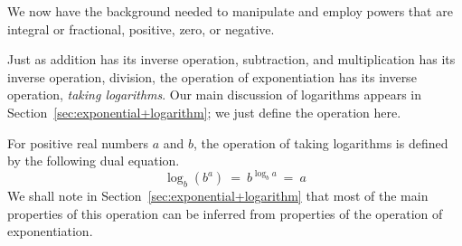 \medskip

We now have the background needed to manipulate and employ powers that are integral or fractional, positive, zero, or negative.

\bigskip

\noindent
Just as addition has its inverse operation, subtraction, and multiplication has its inverse operation, division, the operation of exponentiation has its inverse operation, {\it taking logarithms}.  Our main discussion of logarithms appears in Section~\ref{sec:exponential+logarithm}; we just define the operation here.

\medskip

For positive real numbers $a$ and $b$, the operation of taking logarithms is defined by the following dual equation.
\[ \log_b (b^a) \ = \ b^{\log_b a} \ = \ a \]
We shall note in Section~\ref{sec:exponential+logarithm} that most of the main properties of this operation can be inferred from properties of the operation of exponentiation.

\bigskip

